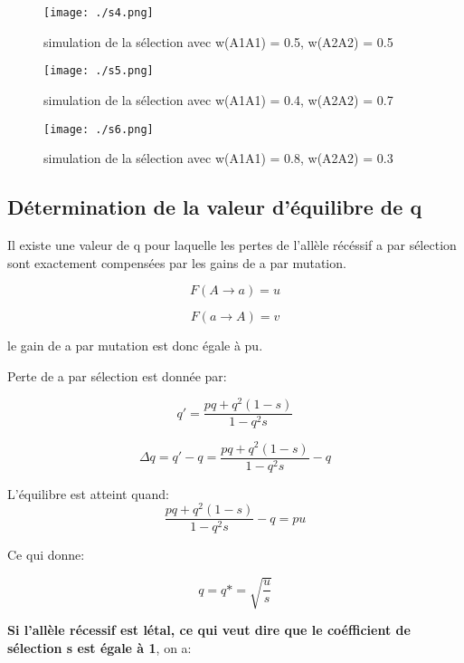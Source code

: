 \documentclass{article}
\begin{document}
\begin{figure}[H]
\texttt{[image: ./s4.png]}
\caption{simulation de la sélection avec w(A1A1) = 0.5, w(A2A2) = 0.5}
\end{figure}

\begin{figure}[H]
\texttt{[image: ./s5.png]}
\caption{simulation de la sélection avec w(A1A1) = 0.4, w(A2A2) = 0.7}
\end{figure}

\begin{figure}[H]
\texttt{[image: ./s6.png]}
\caption{simulation de la sélection avec w(A1A1) = 0.8, w(A2A2) = 0.3}
\end{figure}


\subsection{Détermination de la valeur d'équilibre de q}
Il existe une valeur de q pour laquelle les pertes de l'allèle récéssif a par sélection sont exactement compensées par les gains de a par mutation.

\begin{equation}
F(A\rightarrow a) = u
\end{equation}

\begin{equation}
F(a\rightarrow A) = v
\end{equation}

le gain de a par mutation est donc égale à pu.

Perte de a par sélection est donnée par:

\begin{equation}
q' = \frac{pq+q^2(1-s)}{1-q^2s}
\end{equation}

\begin{equation}
\Delta q = q' - q =  \frac{pq+q^2(1-s)}{1-q^2s} - q
\end{equation}

L'équilibre est atteint quand:
\begin{equation}
\frac{pq+q^2(1-s)}{1-q^2s} - q = pu
\end{equation}

Ce qui donne:

\begin{equation}
q = q* = \sqrt{\frac{u}{s}}
\end{equation}

\textbf{Si l'allèle récessif est létal, ce qui veut dire que le coéfficient de sélection s est égale à 1}, on a:
\end{document}
